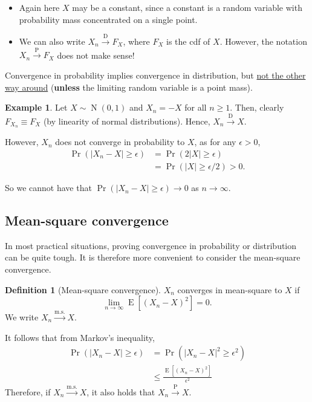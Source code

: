 \documentclass[
]{book}
\providecommand{\tightlist}{%
  \setlength{\itemsep}{0pt}\setlength{\parskip}{0pt}}
\DeclareMathOperator{\E}{E}
\DeclareMathOperator{\N}{N}
\theoremstyle{definition}
\newtheorem{definition}{Definition}[chapter]
\theoremstyle{definition}
\newtheorem{example}{Example}[chapter]
\theoremstyle{definition}
\theoremstyle{definition}
\theoremstyle{remark}
\begin{document}
\begin{itemize}
\tightlist
\item
  Again here \(X\) may be a constant, since a constant is a random variable with probability mass concentrated on a single point.
\item
  We can also write \(X_n{\xrightarrow{\text{D}}} F_X\), where \(F_X\) is the cdf of \(X\). However, the notation \(X_n{\xrightarrow{\text{P}}} F_X\) does not make sense!
\end{itemize}

Convergence in probability implies convergence in distribution, but \uline{not the other way around} (\textbf{unless} the limiting random variable is a point mass).

\begin{example}
Let \(X\sim\N(0,1)\) and \(X_n=-X\) for all \(n \geq 1\). Then, clearly
\(F_{X_n} \equiv F_{X}\) (by linearity of normal distributions). Hence,
\(X_n\xrightarrow{\text{D}}X\).

However, \(X_n\) does not converge in probability to \(X\), as for any \(\epsilon>0\),
\[\begin{aligned}
       \Pr(|X_n-X|\geq\epsilon) &= \Pr(2|X|\geq\epsilon) \\
       &= \Pr(|X|\geq\epsilon/2) > 0.
    \end{aligned}\]

So we cannot have that \(\Pr(|X_n-X|\geq\epsilon) \to 0\) as \(n\to\infty\).
\end{example}

\hypertarget{mean-square-convergence}{%
\subsection{Mean-square convergence}\label{mean-square-convergence}}

In most practical situations, proving convergence in probability or distribution can be quite tough.
It is therefore more convenient to consider the mean-square convergence.

\begin{definition}[Mean-square convergence]
\(X_n\) converges in mean-square to \(X\) if
\[\lim_{n\to\infty} \E\left[(X_n - X)^2 \right] = 0.\]
We write \(X_n\xrightarrow{\text{m.s.}}X\).
\end{definition}

It follows that from Markov's inequality,
\[\begin{aligned}
\Pr(|X_n-X|\geq \epsilon)
&= \Pr(|X_n-X|^2\geq \epsilon^2) \\
    &\leq \frac{\E\left[(X_n - X)^2 \right]}{\epsilon^2}
\end{aligned}\]
Therefore, if \(X_n\xrightarrow{\text{m.s.}}X\), it also
holds that \(X_n\xrightarrow{\text{P}}X\).
\end{document}
